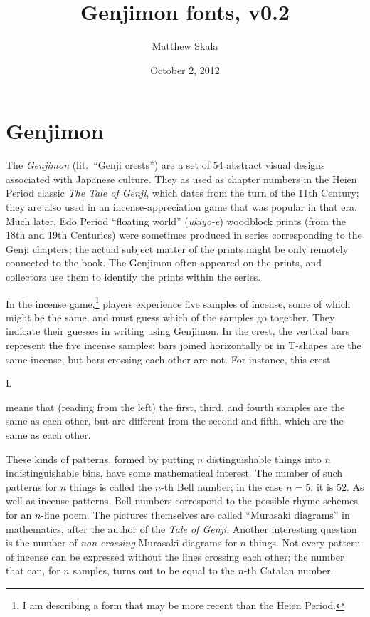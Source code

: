 \documentclass{mitsuba}
\title{Genjimon fonts, v0.2}
\author{Matthew Skala}
\date{October 2, 2012}
\newcommand\genji[1]{{\genjiface #1}}
\begin{document}

\maketitle

\chapter{Genjimon}

The \textit{Genjimon} (lit.~``Genji crests'') are a set of 54 abstract
visual designs associated with Japanese culture.  They as used as chapter
numbers in the Heien Period classic \textit{The Tale of Genji}, which dates
from the turn of the 11th Century; they are also used in an
incense-appreciation game that was popular in that era.  Much later, Edo
Period ``floating world'' (\textit{ukiyo-e}) woodblock prints (from the 18th
and 19th Centuries) were sometimes produced in series corresponding to the
Genji chapters; the actual subject matter of the prints might be only
remotely connected to the book.  The Genjimon often appeared on the prints,
and collectors use them to identify the prints within the series.

In the incense game,\footnote{I am describing a form that may be more recent
than the Heien Period.} players experience five samples of incense, some
of which might be the same, and must guess which of the samples go together.
They indicate their guesses in writing using
Genjimon.  In the crest, the vertical bars represent the five incense
samples; bars joined horizontally or in \textsf{T}-shapes are the same
incense, but bars crossing each other are not.  For instance, this crest
\begin{center}
  \Huge\genji{L}
\end{center}
means that (reading from the left) the first, third, and fourth samples are
the same as each other, but are different from the second and fifth, which are
the same as each other.

These kinds of patterns, formed by putting $n$ distinguishable things into
$n$ indistinguishable bins, have some mathematical interest.  The number of
such patterns for $n$ things is called the $n$-th Bell number; in the case
$n=5$, it is $52$. As well as incense patterns, Bell numbers correspond to
the possible rhyme schemes for an $n$-line poem.  The pictures themselves
are called ``Murasaki diagrams'' in mathematics, after the author of the
\textit{Tale of Genji}.  Another interesting question is the number of
\emph{non-crossing} Murasaki diagrams for $n$ things.  Not every pattern of
incense can be expressed without the lines crossing each other; the number
that can, for $n$ samples, turns out to be equal to the $n$-th Catalan
number.
\end{document}
